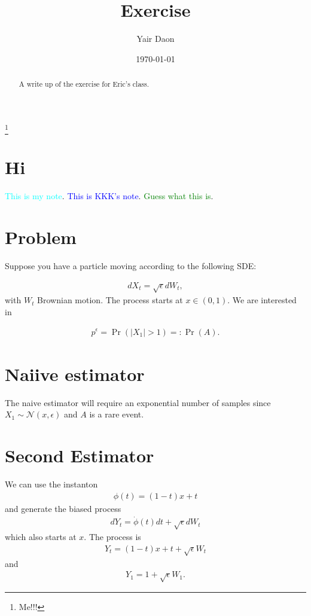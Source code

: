 \documentclass[11pt]{amsart}
\newcommand{\N}{\mathcal{N}}
\newcommand{\want}{p^{\epsilon}}
\newcommand{\noise}{\sqrt{\epsilon}}
\newcommand{\kknote}[1]{{\textcolor{blue}{#1}}}
\newcommand{\ydnote}[1]{{\textcolor{cyan}{#1}}}
\newcommand{\dmnote}[1]{{\textcolor{green}{#1}}}
\begin{document}
\title{Exercise}

\author{Yair Daon}
\address{Courant Institute of Mathematical Sciences \\ New York University \\ 251 Mercer St., New York, NY}


\thanks{Me!!!} 
\date{\today}

\begin{abstract}
  A write up of the exercise for Eric's class.
\end{abstract}


\maketitle


\section{Hi}
\ydnote{This is my note}. \kknote{This is KKK's note}. \dmnote{Guess what this is}.
\section{Problem}
Suppose you have a particle moving according to the following SDE:

\begin{align*}
  dX_t = \noise dW_t,
\end{align*}
with $W_t$ Brownian motion. The process starts at $x \in (0,1)$. We are
interested in 

\begin{align*}
  \want = \Pr( |X_1| > 1 ) =:\Pr(A). 
\end{align*}

\section{Naiive estimator}
The naive estimator will require an exponential number of samples since 
$X_1 \sim \N( x, \epsilon )$ and $A$ is a rare event.

\section{Second Estimator}
We can use the instanton 
\begin{align*}
  \phi(t) = (1-t)x + t
\end{align*}
and generate the biased process
\begin{align*}
dY_t = \dot{\phi}(t)dt + \noise dW_t
\end{align*}
which also starts at $x$. The process is
\begin{align*}
  Y_t = (1-t)x + t + \noise W_t
\end{align*}
and
\begin{align*}
  Y_1 = 1 + \noise W_1.
\end{align*}
\end{document}
